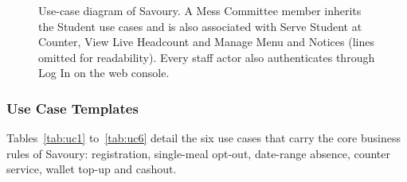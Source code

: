 \documentclass[11pt,a4paper]{article}
\newcommand{\actor}[3]{%
  \begin{scope}[shift={#2}]
    \draw (0,0.62) circle (0.19);
    \draw (0,0.43) -- (0,-0.08);
    \draw (-0.32,0.22) -- (0.32,0.22);
    \draw (0,-0.08) -- (-0.24,-0.5);
    \draw (0,-0.08) -- (0.24,-0.5);
    \node[below, font=\small\bfseries, align=center] at (0,-0.5) {#3};
    \coordinate (#1) at (0,0.15);
  \end{scope}}
\begin{document}
\begin{figure}[H]
{}
\caption{Use-case diagram of Savoury. A Mess Committee member inherits the Student
use cases and is also associated with Serve Student at Counter, View Live
Headcount and Manage Menu and Notices (lines omitted for readability). Every staff
actor also authenticates through Log In on the web console.}
\label{fig:usecase}
\end{figure}

\subsubsection{Use Case Templates}

Tables~\ref{tab:uc1} to~\ref{tab:uc6} detail the six use cases that carry the
core business rules of Savoury: registration, single-meal opt-out, date-range
absence, counter service, wallet top-up and cashout.
\end{document}
